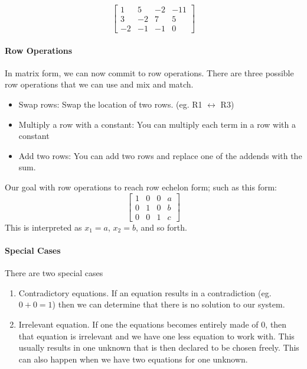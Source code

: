 \[ \left[ \begin{array}{ccc|c}
1& 5&-2& -11 \\
3&-2& 7& 5 \\
-2&-1&-1& 0
\end{array}\right]\]

\paragraph{Row Operations} In matrix form, we can now commit to row operations. There are three possible row operations that we can use and mix and match.
\begin{itemize}
	\item Swap rows: Swap the location of two rows. (eg. R1 $\leftrightarrow$ R3)
	\item Multiply a row with a constant: You can multiply each term in a row with a constant
	\item Add two rows: You can add two rows and replace one of the addends with the sum.
\end{itemize}
Our goal with row operations to reach row echelon form; such as this form: 
\[ \left[ \begin{array}{ccc|c}
1 & 0 & 0 & a \\
0 & 1 & 0 & b \\
0 & 0 & 1 & c
\end{array}\right]\]
This is interpreted as $x_1 = a$, $x_2 = b$, and so forth.

\paragraph{Special Cases} There are two special cases
\begin{enumerate}
	\item Contradictory equations. If an equation results in a contradiction (eg. $ 0 + 0 = 1$) then we can determine that there is no solution to our system.
	\item Irrelevant equation. If one the equations becomes entirely made of $0$, then that equation is irrelevant and we have one less equation to work with. This usually results in one unknown that is then declared to be chosen freely. This can also happen when we have two equations for one unknown. 
\end{enumerate}
